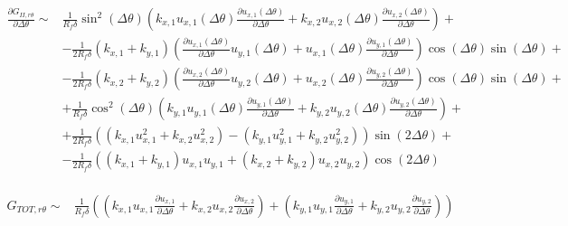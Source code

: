 \documentclass[a4paper]{jpconf}
\begin{document}
\begin{equation}
\begin{split}
\frac{\partial G_{II,r\theta}}{\partial\Delta\theta} \sim&\frac{1}{R_{f}\delta}\sin^{2}\left(\Delta\theta\right)\left( k_{x,1}u_{x,1}\left(\Delta\theta\right)\frac{\partial u_{x,1}\left(\Delta\theta\right)}{\partial\Delta\theta}+k_{x,2}u_{x,2}\left(\Delta\theta\right)\frac{\partial u_{x,2}\left(\Delta\theta\right)}{\partial\Delta\theta}\right)+\\
&-\frac{1}{2R_{f}\delta}\left(k_{x,1}+k_{y,1}\right)\left(\frac{\partial u_{x,1}\left(\Delta\theta\right)}{\partial\Delta\theta}u_{y,1}\left(\Delta\theta\right)+u_{x,1}\left(\Delta\theta\right)\frac{\partial u_{y,1}\left(\Delta\theta\right)}{\partial\Delta\theta}\right)\cos\left(\Delta\theta\right)\sin\left(\Delta\theta\right)+\\
&-\frac{1}{2R_{f}\delta}\left(k_{x,2}+k_{y,2}\right)\left(\frac{\partial u_{x,2}\left(\Delta\theta\right)}{\partial\Delta\theta}u_{y,2}\left(\Delta\theta\right)+u_{x,2}\left(\Delta\theta\right)\frac{\partial u_{y,2}\left(\Delta\theta\right)}{\partial\Delta\theta}\right)\cos\left(\Delta\theta\right)\sin\left(\Delta\theta\right)+\\
&+\frac{1}{R_{f}\delta}\cos^{2}\left(\Delta\theta\right)\left(k_{y,1}u_{y,1}\left(\Delta\theta\right)\frac{\partial u_{y,1}\left(\Delta\theta\right)}{\partial\Delta\theta}+k_{y,2}u_{y,2}\left(\Delta\theta\right)\frac{\partial u_{y,2}\left(\Delta\theta\right)}{\partial\Delta\theta}\right)+\\
&+\frac{1}{2R_{f}\delta}\left(\left(k_{x,1}u^{2}_{x,1}+k_{x,2}u^{2}_{x,2}\right)-\left(k_{y,1}u^{2}_{y,1}+k_{y,2}u^{2}_{y,2}\right)\right)\sin\left(2\Delta\theta\right)+\\
&-\frac{1}{2R_{f}\delta}\left(\left(k_{x,1}+k_{y,1}\right)u_{x,1}u_{y,1}+\left(k_{x,2}+k_{y,2}\right)u_{x,2}u_{y,2}\right)\cos\left(2\Delta\theta\right)\\
\end{split}
\end{equation}

\begin{equation}
\begin{split}
G_{TOT,r\theta} \sim &\frac{1}{R_{f}\delta}\left(\left( k_{x,1}u_{x,1}\frac{\partial u_{x,1}}{\partial\Delta\theta}+k_{x,2}u_{x,2}\frac{\partial u_{x,2}}{\partial\Delta\theta}\right)+\left(k_{y,1}u_{y,1}\frac{\partial u_{y,1}}{\partial\Delta\theta}+k_{y,2}u_{y,2}\frac{\partial u_{y,2}}{\partial\Delta\theta}\right)\right)
\end{split}
\end{equation}
\end{document}
